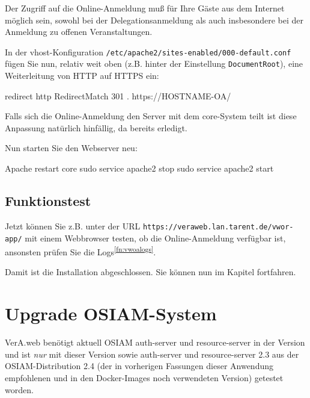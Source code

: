 Der Zugriff auf die Online-Anmeldung muß für Ihre Gäste aus dem Internet
möglich sein, sowohl bei der Delegationsanmeldung als auch insbesondere
bei der Anmeldung zu offenen Veranstaltungen.

\begin{minipage}{\linewidth}
In der vhost-Konfiguration \texttt{/etc/apache2/sites-enabled/000-default.conf}
fügen Sie nun, relativ weit oben (z.B. hinter der Einstellung
\texttt{DocumentRoot}), eine Weiterleitung von HTTP auf HTTPS ein:

\begin{lstdump}{redirect http}
RedirectMatch 301 . https://HOSTNAME-OA/
\end{lstdump}
\end{minipage}

Falls sich die Online-Anmeldung den Server mit dem core-System teilt ist
diese Anpassung natürlich hinfällig, da bereits erledigt.

\begin{minipage}{\linewidth}
Nun starten Sie den Webserver neu:

\begin{lstdump}{Apache restart core}
sudo service apache2 stop
sudo service apache2 start
\end{lstdump}
\end{minipage}

\subsection{Funktionstest}\label{subsec:setup-oa-check}

Jetzt können Sie \dash z.B. unter der URL
\texttt{https://veraweb.lan.tarent.de/vwor-app/} \dash mit einem
Webbrowser testen, ob die Online-Anmeldung verfügbar ist, ansonsten
prüfen Sie die Logs\Hair\textsuperscript{\ref{fn:vwoalogs}}.

\fi%

Damit ist die Installation abgeschlossen.
Sie können nun im Kapitel  fortfahren.

\newpage

\ifoa

\section{Upgrade OSIAM-System}\label{sec:upgrade-osiam}

VerA.web benötigt aktuell OSIAM auth-server und resource-server in
der Version \vwiaversosiam{} und ist \emph{nur} mit dieser Version
sowie auth-server und resource-server 2.3 aus der OSIAM-Distribution
2.4 (der in vorherigen Fassungen dieser Anwendung empfohlenen und in
den Docker-Images noch verwendeten Version) getestet worden.\keinumbruch

